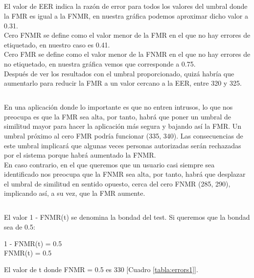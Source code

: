 \documentclass[10pt,a4paper]{article}
\begin{document}
\pagebreak

\subsection{}
El valor de EER indica la razón de error para todos los valores del umbral donde la FMR es igual a la FNMR, en nuestra gráfica podemos aproximar dicho valor a 0.31.\\
Cero FNMR se define como el valor menor de la FMR en el que no hay errores de etiquetado, en nuestro caso es 0.41.\\
Cero FMR se define como el valor menor de la FNMR en el que no hay errores de no etiquetado, en nuestra gráfica vemos que corresponde a 0.75.\\

Después de ver los resultados con el umbral proporcionado, quizá habría que aumentarlo para reducir la FMR a un valor cercano a la EER, entre 320 y 325.

\subsection{}
En una aplicación donde lo importante es que no entren intrusos, lo que nos preocupa es que la FMR sea alta, por tanto, habrá que poner un umbral de similitud mayor para hacer la aplicación más segura y bajando así la FMR. Un umbral próximo al cero FMR podría funcionar (335, 340). Las consecuencias de este umbral implicará que algunas veces personas autorizadas serán rechazadas por el sistema porque habrá aumentado la FNMR.\\
En caso contrario, en el que queremos que un usuario casi siempre sea identificado nos preocupa que la FNMR sea alta, por tanto, habrá que desplazar el umbral de similitud en sentido opuesto, cerca del cero FNMR (285, 290), implicando así, a su vez, que la FMR aumente.

\subsection{}
El valor 1 - FNMR(t) se denomina la bondad del test. Si queremos que la bondad sea de 0.5:\\

\begin{center}
1 - FNMR(t) = 0.5 \\
FNMR(t) = 0.5 
\end{center}

El valor de t donde FNMR = 0.5 es 330 [Cuadro \ref{tabla:errors1}].\\
\end{document}
